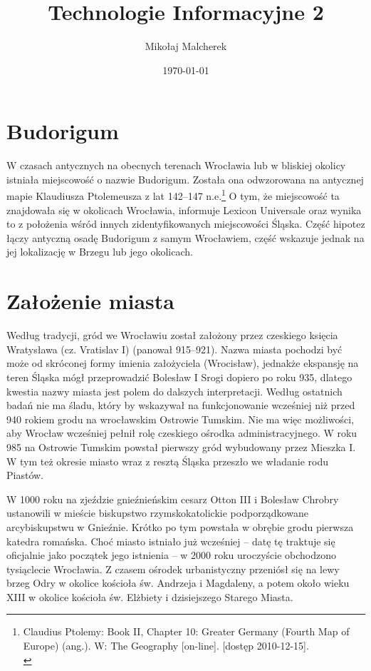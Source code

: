 \documentclass{article}
\title{Technologie Informacyjne 2}
\author{Mikołaj Malcherek}
\date{\today}
\begin{document}
\maketitle

\tableofcontents

\section{Budorigum}
W czasach antycznych na obecnych terenach Wrocławia lub w bliskiej okolicy istniała miejscowość o nazwie Budorigum. Została ona odwzorowana na antycznej mapie Klaudiusza Ptolemeusza z lat 142–147 n.e.\footnote{Claudius Ptolemy: Book II, Chapter 10: Greater Germany (Fourth Map of Europe) (ang.). W: The Geography [on-line]. [dostęp 2010-12-15].\\} O tym, że miejscowość ta znajdowała się w okolicach Wrocławia, informuje Lexicon Universale oraz wynika to z położenia wśród innych zidentyfikowanych miejscowości Śląska. Część hipotez łączy antyczną osadę Budorigum z samym Wrocławiem, część wskazuje jednak na jej lokalizację w Brzegu lub jego okolicach.
\section{Założenie miasta}
Według tradycji, gród we Wrocławiu został założony przez czeskiego księcia Wratysława (cz. Vratislav I) (panował 915–921). Nazwa miasta pochodzi być może od skróconej formy imienia założyciela (Wrocisław), jednakże ekspansję na teren Śląska mógł przeprowadzić Bolesław I Srogi dopiero po roku 935, dlatego kwestia nazwy miasta jest polem do dalszych interpretacji. Według ostatnich badań nie ma śladu, który by wskazywał na funkcjonowanie wcześniej niż przed 940 rokiem grodu na wrocławskim Ostrowie Tumskim. Nie ma więc możliwości, aby Wrocław wcześniej pełnił rolę czeskiego ośrodka administracyjnego. W roku 985 na Ostrowie Tumskim powstał pierwszy gród wybudowany przez Mieszka I. W tym też okresie miasto wraz z resztą Śląska przeszło we władanie rodu Piastów.

W 1000 roku na zjeździe gnieźnieńskim cesarz Otton III i Bolesław Chrobry ustanowili w mieście biskupstwo rzymskokatolickie podporządkowane arcybiskupstwu w Gnieźnie. Krótko po tym powstała w obrębie grodu pierwsza katedra romańska. Choć miasto istniało już wcześniej – datę tę traktuje się oficjalnie jako początek jego istnienia – w 2000 roku uroczyście obchodzono tysiąclecie Wrocławia. Z czasem ośrodek urbanistyczny przeniósł się na lewy brzeg Odry w okolice kościoła św. Andrzeja i Magdaleny, a potem około wieku XIII w okolice kościoła św. Elżbiety i dzisiejszego Starego Miasta.
\end{document}
